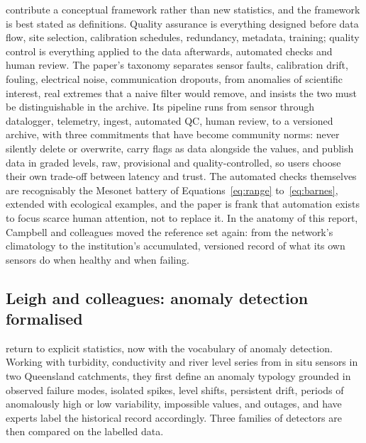 \citet{campbell2013} contribute a conceptual framework rather than new
statistics, and the framework is best stated as definitions. Quality
assurance is everything designed before data flow, site selection,
calibration schedules, redundancy, metadata, training; quality control is
everything applied to the data afterwards, automated checks and human
review. The paper's taxonomy separates sensor faults, calibration drift,
fouling, electrical noise, communication dropouts, from anomalies of
scientific interest, real extremes that a naive filter would remove, and
insists the two must be distinguishable in the archive. Its pipeline runs
from sensor through datalogger, telemetry, ingest, automated QC, human
review, to a versioned archive, with three commitments that have become
community norms: never silently delete or overwrite, carry flags as data
alongside the values, and publish data in graded levels, raw, provisional
and quality-controlled, so users choose their own trade-off between latency
and trust. The automated checks themselves are recognisably the Mesonet
battery of Equations~\eqref{eq:range} to~\eqref{eq:barnes}, extended with
ecological examples, and the paper is frank that automation exists to focus
scarce human attention, not to replace it. In the anatomy of this report,
Campbell and colleagues moved the reference set again: from the network's
climatology to the institution's accumulated, versioned record of what its
own sensors do when healthy and when failing.

\subsection{Leigh and colleagues: anomaly detection formalised}
\label{sec:tech-leigh}

\citet{leigh2019} return to explicit statistics, now with the vocabulary of
anomaly detection. Working with turbidity, conductivity and river level
series from in situ sensors in two Queensland catchments, they first define
an anomaly typology grounded in observed failure modes, isolated spikes,
level shifts, persistent drift, periods of anomalously high or low
variability, impossible values, and outages, and have experts label the
historical record accordingly. Three families of detectors are then
compared on the labelled data.

